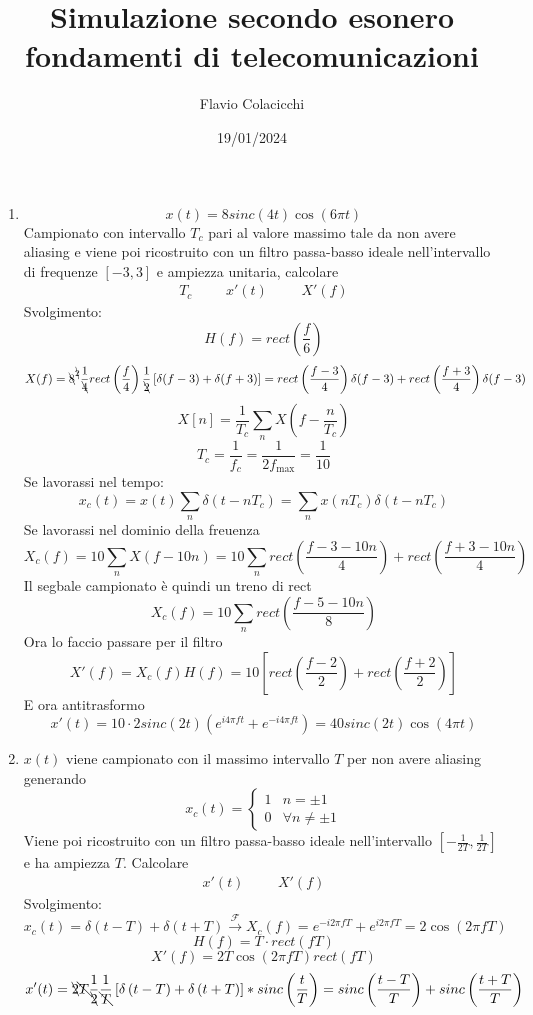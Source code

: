 \documentclass{article}
\title{Simulazione secondo esonero\\\normalsize fondamenti di telecomunicazioni}
\author{Flavio Colacicchi}
\date{19/01/2024}
\newcommand{\trasformata}{\xrightarrow{\mathscr{F}}}
\begin{document}
\maketitle
\begin{enumerate}
  \item \[x(t)=8sinc(4t)\cos(6\pi t)\]
    Campionato con intervallo \(T_c\) pari al valore massimo tale da non avere aliasing e viene poi ricostruito con un filtro passa-basso ideale nell'intervallo di frequenze \([-3,3]\) e ampiezza unitaria, calcolare
    \[\begin{matrix}
      T_c&&&x'(t)&&&X'(f)
    \end{matrix}\]
    Svolgimento:
    \[H(f)=rect\left(\frac{f}{6}\right)\]
    \[X(f)={\bcancel{8}}^{\bcancel{2}}\frac{1}{\bcancel{4}}rect\left(\frac{f}{4}\right)\frac{1}{\bcancel{2}}\left[\delta(f-3)+\delta(f+3)\right]=rect\left(\frac{f-3}{4}\right)\delta(f-3)+rect\left(\frac{f+3}{4}\right)\delta(f-3)\]
    \[X[n]=\frac{1}{T_c}\sum_{n}X\left(f-\frac{n}{T_c}\right)\]
    \[T_c=\frac{1}{f_c}=\frac{1}{2f_{\max}}=\frac{1}{10}\]
    Se lavorassi nel tempo:
    \[x_c(t)=x(t)\sum_{n}\delta(t-nT_c)=\sum_n x(n T_c)\delta(t-nT_c)\]
    Se lavorassi nel dominio della freuenza
    \[X_c(f)=10\sum_{n}X\left(f-10n\right)=10\sum_{n}rect\left(\frac{f-3-10n}{4}\right)+rect\left(\frac{f+3-10n}{4}\right)\]
    Il segbale campionato è quindi un treno di rect 
    \[X_c(f)=10\sum_n rect\left(\frac{f-5-10n}{8}\right)\]
    Ora lo faccio passare per il filtro
    \[X'(f)=X_c(f)H(f)=10\left[rect\left(\frac{f-2}{2}\right)+rect\left(\frac{f+2}{2}\right)\right]\]
    E ora antitrasformo
    \[x'(t)=10\cdot 2sinc(2t)(e^{i4\pi ft}+e^{-i4\pi ft})=40sinc(2t)\cos(4\pi t)\]
  \item \(x(t)\) viene campionato con il massimo intervallo \(T\) per non avere aliasing generando
    \[x_c(t)=\begin{cases}
      1&n=\pm 1\\
      0&\forall n\neq\pm 1
    \end{cases}\]
    Viene poi ricostruito con un filtro passa-basso ideale nell'intervallo \([-\frac{1}{2T},\frac{1}{2T}]\) e ha ampiezza \(T\). Calcolare
    \[\begin{matrix}
      x'(t)&&&X'(f)
    \end{matrix}\]
    Svolgimento:
    \[x_c(t)=\delta(t-T)+\delta(t+T)\trasformata X_c(f)=e^{-i2\pi fT}+e^{i2\pi fT}=2\cos(2\pi fT)\]
    \[H(f)=T\cdot rect\left(fT\right)\]
    \[X'(f)=2T\cos(2\pi fT)rect(fT)\]
    \[x'(t)=\bcancel{2}\bcancel{T}\frac{1}{\bcancel{2}}\frac{1}{\bcancel{T}}\left[\delta\left(t-T\right)+\delta\left(t+T\right)\right]*sinc\left(\frac{t}{T}\right)=sinc\left(\frac{t-T}{T}\right)+sinc\left(\frac{t+T}{T}\right)\]

\end{enumerate}
\end{document}
